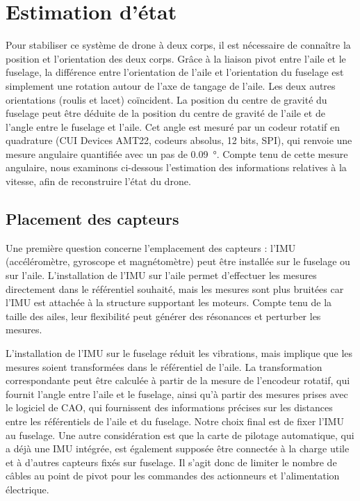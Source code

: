 \section{Estimation d'état}\label{sec:stateEst}


Pour stabiliser ce système de drone à deux corps, il est nécessaire de connaître la position et l'orientation des deux corps. Grâce à la liaison pivot entre l'aile et le fuselage, la différence entre l'orientation de l'aile et l'orientation du fuselage est simplement une rotation autour de l'axe de tangage de l'aile. Les deux autres orientations (roulis et lacet) coïncident. La position du centre de gravité du fuselage peut être déduite de la position du centre de gravité de l'aile et de l'angle entre le fuselage et l'aile. Cet angle est mesuré par un codeur rotatif en quadrature (CUI Devices AMT22, codeurs absolus, 12 bits, SPI), qui renvoie une mesure angulaire quantifiée avec un pas de \SI{0,09}{\degree}. Compte tenu de cette mesure angulaire, nous examinons ci-dessous l'estimation des informations relatives à la vitesse, afin de reconstruire l'état du drone.

\subsection{Placement des capteurs}
\label{subsec:sens_pos}
Une première question concerne l'emplacement des capteurs : l'IMU (accéléromètre, gyroscope et magnétomètre) peut être installée sur le fuselage ou sur l'aile. 
L'installation de l'IMU sur l'aile permet d'effectuer les mesures directement dans le référentiel souhaité, mais les mesures sont plus bruitées car l'IMU est attachée à la structure supportant les moteurs. Compte tenu de la taille des ailes, leur flexibilité peut générer des résonances et perturber les mesures. 

L'installation de l'IMU sur le fuselage réduit les vibrations, mais implique que les mesures soient transformées dans le référentiel de l'aile. La transformation correspondante peut être calculée à partir de la mesure de l'encodeur rotatif, qui fournit l'angle entre l'aile et le fuselage, ainsi qu'à partir des mesures prises avec le logiciel de CAO, qui fournissent des informations précises sur les distances entre les référentiels de l'aile et du fuselage. Notre choix final est de fixer l'IMU au fuselage. Une autre considération est que la carte de pilotage automatique, qui a déjà une IMU intégrée, est également supposée être connectée à la charge utile et à d'autres capteurs fixés sur fuselage. Il s'agit donc de limiter le nombre de câbles au point de pivot pour les commandes des actionneurs et l'alimentation électrique.

